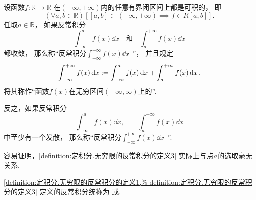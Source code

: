 \begin{definition}\label{definition:定积分.无穷限的反常积分的定义3}
设函数\(f\colon\mathbb{R}\to\mathbb{R}\)
在\((-\infty,+\infty)\)内的任意有界闭区间上都是可积的，
即\begin{equation*}
	(\forall a,b\in\mathbb{R})
	[
		[a,b]\subset(-\infty,+\infty)
		\implies
		f \in R[a,b]
	].
\end{equation*}
任取\(a\in\mathbb{R}\)，
如果反常积分\begin{equation*}
	\int_{-\infty}^a f(x) \dd{x}
	\quad\text{和}\quad
	\int_a^{+\infty} f(x) \dd{x}
\end{equation*}都收敛，
那么称“反常积分\(\int_{-\infty}^{+\infty} f(x) \dd{x}\)~”，
并且规定\begin{equation*}
	\int_{-\infty}^{+\infty} f(x) \dd{x}
	:=
	\int_{-\infty}^a f(x) \dd{x} + \int_a^{+\infty} f(x) \dd{x},
\end{equation*}
将其称作“函数\(f(x)\)在无穷区间\((-\infty,\infty)\)上的”.

反之，如果反常积分\begin{equation*}
	\int_{-\infty}^a f(x) \dd{x}, \qquad
	\int_a^{+\infty} f(x) \dd{x}
\end{equation*}中至少有一个发散，
那么称“反常积分\(\int_{-\infty}^{+\infty} f(x) \dd{x}\)~”.
\end{definition}

容易证明，\cref{definition:定积分.无穷限的反常积分的定义3} 实际上与点\(a\)的选取毫无关系.

\cref{definition:定积分.无穷限的反常积分的定义1,%
definition:定积分.无穷限的反常积分的定义3}
定义的反常积分统称为%
或.

